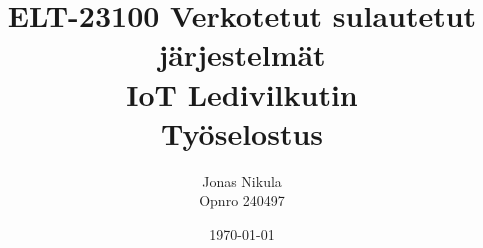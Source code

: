 \documentclass{article}
\title{ELT-23100 Verkotetut sulautetut järjestelmät \\ IoT Ledivilkutin \\ Työselostus} %
\author{Jonas Nikula \\ Opnro 240497} %
\date{\today} %
\begin{document}
\maketitle %






\renewcommand{\refname}{Viitteet}


\end{document}
